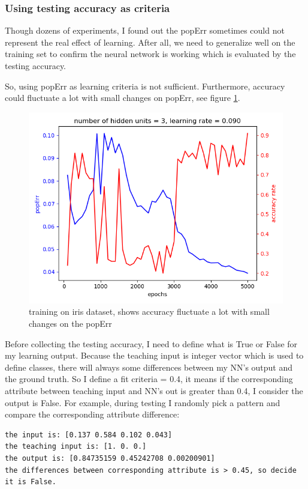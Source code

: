 \documentclass[11pt]{article}
\begin{document}
\subsubsection{Using testing accuracy as criteria}
\label{sec-3-1-1}
Though dozens of experiments, I found out the popErr sometimes could not represent the real effect of learning. After all, we need to generalize well on the training set to confirm the neural network is working which is evaluated by the testing accuracy.  

So, using popErr as learning criteria is not sufficient. Furthermore, accuracy could fluctuate a lot with small changes on popErr, see figure \ref{fig-iris-fluctuate}.
\begin{figure}[htb]
\centering
\includegraphics[width=.9\linewidth]{./popErr_vs_accuracy_on_iris_accuracy_fluctuate_with_popErr.png}
\caption{training on iris dataset, shows accuracy fluctuate a lot with small changes on the popErr  \label{fig-iris-fluctuate}}
\end{figure}

Before collecting the testing accuracy, I need to define what is True or False for my learning output. Because the teaching input is integer vector which is used to define classes, there will always some differences between my NN's output and the ground truth. So I define a fit criteria = 0.4, it means if the corresponding attribute between teaching input and NN's out is greater than 0.4, I consider the output is False. For example, during testing I randomly pick a pattern and compare the corresponding attribute difference:
\begin{verbatim}
the input is: [0.137 0.584 0.102 0.043]
the teaching input is: [1. 0. 0.]
the output is: [0.84735159 0.45242708 0.00200901]
the differences between corresponding attribute is > 0.45, so decide it is False.
\end{verbatim}
\end{document}
